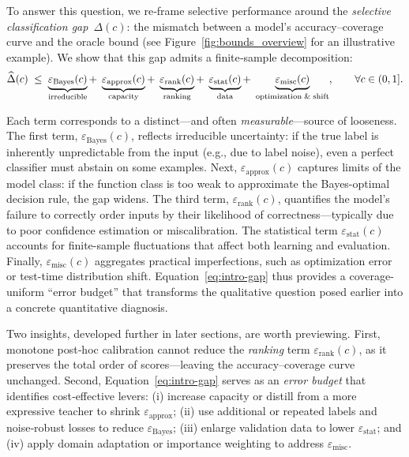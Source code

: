 To answer this question, we re‑frame selective performance around the \emph{selective classification
gap}~\(\Delta(c)\): the mismatch between a model’s accuracy–coverage curve and the oracle
bound (see Figure~\ref{fig:bounds_overview} for an illustrative example). 
We show that this gap admits a finite‑sample decomposition:
\begin{equation}
\label{eq:intro-gap}
\widehat{\Delta}(c)
\;\le\;
\underbrace{\varepsilon_{\text{Bayes}}(c)}_{\text{\scriptsize irreducible}}
+\;\underbrace{\varepsilon_{\text{approx}}(c)}_{\text{\scriptsize capacity}}
+\;\underbrace{\varepsilon_{\text{rank}}(c)}_{\text{\scriptsize ranking}}
+\;\underbrace{\varepsilon_{\text{stat}}(c)}_{\text{\scriptsize data}}
+\;\underbrace{\varepsilon_{\text{misc}}(c)}_{\text{\scriptsize optimization\;\&\;shift}},
\qquad\forall c\in(0,1].
\end{equation}

Each term corresponds to a distinct—and often \emph{measurable}—source of looseness. 
The first term, \(\varepsilon_{\text{Bayes}}(c)\), reflects irreducible uncertainty: if the true label is inherently unpredictable from the input (e.g., due to label noise), even a perfect classifier must abstain on some examples. 
Next, \(\varepsilon_{\text{approx}}(c)\) captures limits of the model class: if the function class is too weak to approximate the Bayes-optimal decision rule, the gap widens. 
The third term, \(\varepsilon_{\text{rank}}(c)\), quantifies the model’s failure to correctly order inputs by their likelihood of correctness—typically due to poor confidence estimation or miscalibration. 
The statistical term \(\varepsilon_{\text{stat}}(c)\) accounts for finite-sample fluctuations that affect both learning and evaluation. 
Finally, \(\varepsilon_{\text{misc}}(c)\) aggregates practical imperfections, such as optimization error or test-time distribution shift. Equation~\eqref{eq:intro-gap} thus provides a coverage-uniform ``error budget'' that transforms the qualitative question posed earlier into a concrete quantitative diagnosis.

Two insights, developed further in later sections, are worth previewing. First, monotone post‑hoc calibration cannot reduce the \emph{ranking} term \(\varepsilon_{\text{rank}}(c)\), as it preserves the total order of scores—leaving the accuracy–coverage curve unchanged. Second, Equation~\eqref{eq:intro-gap} serves as an \emph{error budget} that identifies cost‑effective levers: (i) increase capacity or distill from a more expressive teacher to shrink \(\varepsilon_{\text{approx}}\); (ii) use additional or repeated labels and noise‑robust losses to reduce \(\varepsilon_{\text{Bayes}}\); (iii) enlarge validation data to lower \(\varepsilon_{\text{stat}}\); and (iv) apply domain adaptation or importance weighting to address \(\varepsilon_{\text{misc}}\).

